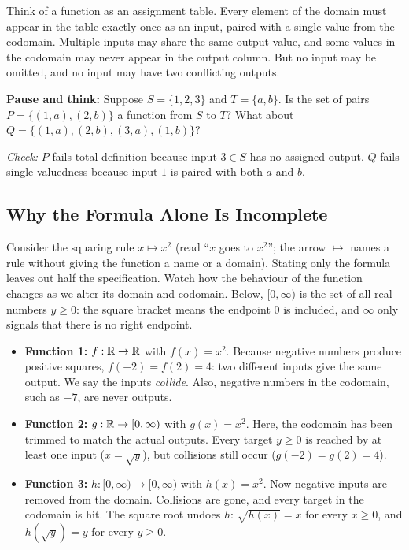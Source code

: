 \begin{intuitionbox}
Think of a function as an assignment table. Every element of the domain must appear in the table exactly once as an input, paired with a single value from the codomain. Multiple inputs may share the same output value, and some values in the codomain may never appear in the output column. But no input may be omitted, and no input may have two conflicting outputs.
\end{intuitionbox}

\begin{recoverybox}
\textbf{Pause and think:} Suppose $S = \{1, 2, 3\}$ and $T = \{a, b\}$. Is the set of pairs $P = \{(1, a), (2, b)\}$ a function from $S$ to $T$? What about $Q = \{(1, a), (2, b), (3, a), (1, b)\}$?

\emph{Check:} $P$ fails total definition because input $3 \in S$ has no assigned output. $Q$ fails single-valuedness because input $1$ is paired with both $a$ and $b$.
\end{recoverybox}

\subsection{Why the Formula Alone Is Incomplete}

Consider the squaring rule $x \mapsto x^2$ (read ``$x$ goes to $x^2$''; the arrow $\mapsto$ names a rule without giving the function a name or a domain). Stating only the formula leaves out half the specification. Watch how the behaviour of the function changes as we alter its domain and codomain. Below, $[0, \infty)$ is the set of all real numbers $y \ge 0$: the square bracket means the endpoint $0$ is included, and $\infty$ only signals that there is no right endpoint.

\begin{itemize}
\item \textbf{Function 1:} $f: \mathbb{R} \to \mathbb{R}$ with $f(x) = x^2$. 
Because negative numbers produce positive squares, $f(-2) = f(2) = 4$: two different inputs give the same output. We say the inputs \emph{collide}. Also, negative numbers in the codomain, such as $-7$, are never outputs.
\item \textbf{Function 2:} $g: \mathbb{R} \to [0, \infty)$ with $g(x) = x^2$.
Here, the codomain has been trimmed to match the actual outputs. Every target $y \ge 0$ is reached by at least one input ($x = \sqrt{y}$), but collisions still occur ($g(-2) = g(2) = 4$).
\item \textbf{Function 3:} $h: [0, \infty) \to [0, \infty)$ with $h(x) = x^2$.
Now negative inputs are removed from the domain. Collisions are gone, and every target in the codomain is hit. The square root undoes $h$: $\sqrt{h(x)} = x$ for every $x \ge 0$, and $h(\sqrt{y}) = y$ for every $y \ge 0$.
\end{itemize}

